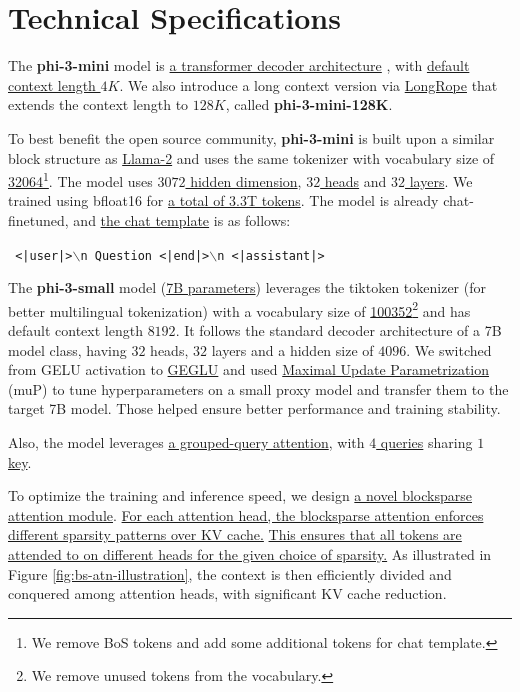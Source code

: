 \documentclass[11pt]{article}
\begin{document}
\section{Technical Specifications}
The \textbf{phi-3-mini} model is \uline{a transformer decoder architecture} \cite{Vas17}, with \uline{default context length $4K$}. We also introduce a long context version via \uline{LongRope} \cite{ding2024longrope} that extends the context length to \uline{$128K$}, called \textbf{phi-3-mini-128K}. 

To best benefit the open source community, \textbf{phi-3-mini} is built upon a similar block structure as \uline{Llama-2} \cite{touvron2023llama} and uses the same tokenizer with vocabulary size of \uline{32064}\footnote{We remove BoS tokens and add some additional tokens for chat template.}. The model uses \uline{$3072$ hidden dimension}, \uline{$32$ heads} and \uline{$32$ layers}. We trained using bfloat16 for \uline{a total of 3.3T tokens}. The model is already chat-finetuned, and \uline{the chat template} is as follows:
\begin{AIbox}{}
\tt \footnotesize 
<|user|>$\backslash$n
Question
<|end|>$\backslash$n
<|assistant|>
\end{AIbox}

The \textbf{phi-3-small} model (\uline{7B parameters}) leverages the tiktoken tokenizer (for better multilingual tokenization) with a vocabulary size of \uline{100352}\footnote{We remove unused tokens from the vocabulary.} and has default context length \uline{$8192$}. It follows the standard decoder architecture of a 7B model class, having \uline{$32$} heads, \uline{$32$} layers and a hidden size of \uline{$4096$}. We switched from GELU activation to \uline{GEGLU} and used \uline{Maximal Update Parametrization} (muP) to tune hyperparameters on a small proxy model and transfer them to the target 7B model. Those helped ensure better performance and training stability.

Also, the model leverages \uline{a grouped-query attention}, with \uline{$4$ queries} sharing \uline{$1$ key}. 

To optimize the training and inference speed, we design \uline{a novel blocksparse attention module}. \uline{For each attention head, the blocksparse attention enforces different sparsity patterns over KV cache.} \uline{This ensures that all tokens are attended to on different heads for the given choice of sparsity.} As illustrated in Figure \ref{fig:bs-atn-illustration}, the context is then efficiently divided and conquered among attention heads, with significant KV cache reduction.
\end{document}
